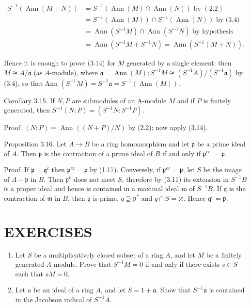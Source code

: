 \documentclass{standalone}
\theoremstyle{definition}
\theoremstyle{remark}
\begin{document}
\[
\begin{aligned}
S^{-1}(\operatorname{Ann}(M+N)) & =S^{-1}(\operatorname{Ann}(M) \cap \operatorname{Ann}(N)) \text { by }(2.2) \\
& =S^{-1}(\operatorname{Ann}(M)) \cap S^{-1}(\operatorname{Ann}(N)) \text { by (3.4) } \\
& =\operatorname{Ann}\left(S^{-1} M\right) \cap \operatorname{Ann}\left(S^{-1} N\right) \text { by hypothesis } \\
& =\operatorname{Ann}\left(S^{-1} M+S^{-1} N\right)=\operatorname{Ann}\left(S^{-1}(M+N)\right) .
\end{aligned}
\]

Hence it is enough to prove (3.14) for $M$ generated by a single element: then $M \cong A / \mathfrak{a}$ (as $A$-module), where $\mathfrak{a}=\operatorname{Ann}(M) ; S^{-1} M \cong\left(S^{-1} A\right) /\left(S^{-1} \mathfrak{a}\right)$ by (3.4), so that Ann $\left(S^{-1} M\right)=S^{-1} \mathfrak{a}=S^{-1}(\operatorname{Ann}(M))$.

Corollary 3.15. If $N, P$ are submodules of an A-module $M$ and if $P$ is finitely generated, then $S^{-1}(N: P)=\left(S^{-1} N: S^{-1} P\right)$.

Proof. $(N: P)=$ Ann $((N+P) / N)$ by (2.2); now apply (3.14).

Proposition 3.16. Let $A \rightarrow B$ be a ring homomorphism and let $\mathfrak{p}$ be a prime ideal of $A$. Then $\mathfrak{p}$ is the contraction of a prime ideal of $B$ if and only if $\mathfrak{p}^{\text {ec }}=\mathfrak{p}$.

Proof. If $\mathfrak{p}=\mathfrak{q}^{c}$ then $\mathfrak{p}^{e c}=\mathfrak{p}$ by (1.17). Conversely, if $\mathfrak{p}^{e c}=\mathfrak{p}$, let $S$ be the image of $A-\mathfrak{p}$ in $B$. Then $\mathfrak{p}^{e}$ does not meet $S$, therefore by (3.11) its extension in $S^{-1} B$ is a proper ideal and hence is contained in a maximal ideal $\mathrm{m}$ of $S^{-1} B$. If $\mathfrak{q}$ is the contraction of $\mathfrak{m}$ in $B$, then $\mathfrak{q}$ is prime, $q \supseteq \mathfrak{p}^{*}$ and $q \cap S=\varnothing$. Hence $\mathfrak{q}^{c}=\mathfrak{p}$.

\section{EXERCISES}
\begin{enumerate}
  \item Let $S$ be a multiplicatively closed subset of a ring $A$, and let $M$ be a finitely generated $A$-module. Prove that $S^{-1} M=0$ if and only if there exists $s \in S$ such that $s M=0$.

  \item Let $a$ be an ideal of a ring $A$, and let $S=1+\mathfrak{a}$. Show that $S^{-1} \mathfrak{a}$ is contained in the Jacobson radical of $S^{-1} A$.

\end{enumerate}
\end{document}
